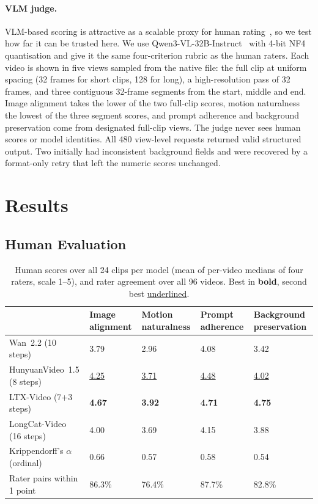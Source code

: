 \documentclass[11pt,a4paper]{article}
\newcommand{\best}[1]{\textbf{#1}}
\newcommand{\second}[1]{\underline{#1}}
\begin{document}
\paragraph{VLM judge.}
VLM-based scoring is attractive as a scalable proxy for human rating~\citep{he2024videoscore}, so we test how far it can be trusted here. We use Qwen3-VL-32B-Instruct~\citep{qwen3vl} with 4-bit NF4 quantisation and give it the same four-criterion rubric as the human raters. Each video is shown in five views sampled from the native file: the full clip at uniform spacing (32 frames for short clips, 128 for long), a high-resolution pass of 32 frames, and three contiguous 32-frame segments from the start, middle and end. Image alignment takes the lower of the two full-clip scores, motion naturalness the lowest of the three segment scores, and prompt adherence and background preservation come from designated full-clip views. The judge never sees human scores or model identities. All 480 view-level requests returned valid structured output. Two initially had inconsistent background fields and were recovered by a format-only retry that left the numeric scores unchanged.

\section{Results}
\label{sec:results}

\subsection{Human Evaluation}

\begin{table}[!htb]
  \centering
  \small
  \caption{Human scores over all 24 clips per model (mean of per-video medians of four raters, scale 1--5), and rater agreement over all 96 videos. Best in \best{bold}, second best \second{underlined}.}
  \label{tab:human}
  \begin{tabularx}{\linewidth}{@{}l Y Y Y Y@{}}
    \toprule
    & Image alignment & Motion naturalness & Prompt adherence & Background preservation \\
    \midrule
    Wan~2.2 (10 steps)         & 3.79          & 2.96          & 4.08          & 3.42 \\
    HunyuanVideo~1.5 (8 steps) & \second{4.25} & \second{3.71} & \second{4.48} & \second{4.02} \\
    LTX-Video (7+3 steps)      & \best{4.67}   & \best{3.92}   & \best{4.71}   & \best{4.75} \\
    LongCat-Video (16 steps)   & 4.00          & 3.69          & 4.15          & 3.88 \\
    \midrule
    Krippendorff's $\alpha$ (ordinal) & 0.66 & 0.57 & 0.58 & 0.54 \\
    Rater pairs within 1 point        & 86.3\% & 76.4\% & 87.7\% & 82.8\% \\
    \bottomrule
  \end{tabularx}
\end{table}
\end{document}
